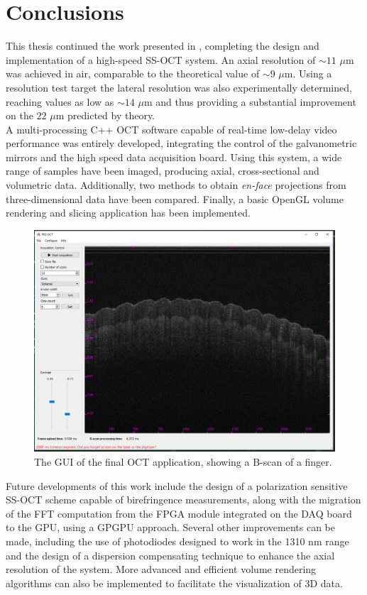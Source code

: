 \chapter{Conclusions}
\label{ch:conclusions}

This thesis continued the work presented in \cite{Calabrese2017}, completing the design and implementation of a high-speed SS-OCT system. An axial resolution of $\sim 11$ $\mu$m was achieved in air,  comparable to the theoretical value of $\sim9$ $\mu$m. Using a resolution test target the lateral resolution was also experimentally determined, reaching values as low as $\sim 14$ $\mu$m and thus providing a substantial improvement on the $22$ $\mu$m predicted by theory. \\

\noindent A multi-processing C++ OCT software capable of real-time low-delay video performance was entirely developed, integrating the control of the galvanometric mirrors and the high speed data acquisition board. Using this system, a wide range of samples have been imaged, producing axial, cross-sectional and volumetric data. Additionally, two methods to obtain \emph{en-face} projections from three-dimensional data have been compared. Finally, a basic OpenGL volume rendering and slicing application has been implemented. \\


\begin{figure}[htb]
	\myfloatalign
	\includegraphics[width=1\linewidth]{gfx/ch4/gui}
	\caption{The \ac{GUI} of the final OCT application, showing a B-scan of a finger.}\label{fig:gui}
\end{figure}


\noindent Future developments of this work include the design of a polarization sensitive SS-OCT scheme capable of birefringence measurements, along with the migration of the FFT computation from the FPGA module integrated on the DAQ board to the GPU, using a GPGPU approach. Several other improvements can be made, including the use of photodiodes designed to work in the 1310 nm range and the design of a dispersion compensating technique to enhance the axial resolution of the system. More advanced and efficient volume rendering algorithms can also be implemented to facilitate the visualization of 3D data. 


